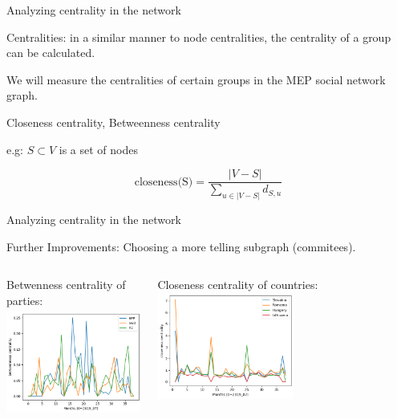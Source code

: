 \documentclass{beamer}
\begin{document}
\begin{frame}{Analyzing centrality in the network}
	
	Centralities: in a similar manner to node centralities, the centrality of a group can be calculated. 
	
	\vspace{2mm}
	
	\pause We will measure the centralities of certain groups in the MEP social network graph. 
	
	\vspace{2mm}
	
	\pause Closeness centrality, Betweenness centrality
	
	\vspace{2mm} e.g: $S \subset V$ is a set of nodes 
	
	\pause \[
		\text{closeness(S)} = \frac{|V-S|}{\sum_{u \in |V-S|}d_{S,u} }
	\]
	
\end{frame}

\begin{frame}{Analyzing centrality in the network}
	
	Further Improvements: Choosing a more telling subgraph (commitees).
	\vspace{4mm}
	\pause
	
	\begin{columns}
	\column{5cm}
	Betwenness centrality of parties:
	\\
	\includegraphics[height=3.5cm]{img/BTW_group_centrality_party_biggest3.png}

	\pause \column{5cm}
	Closeness centrality of countries:
	\includegraphics[height=3.5cm]{img/Closeness_group_centrality_country_close_4.png}

	\end{columns}
	
\end{frame}
\end{document}
